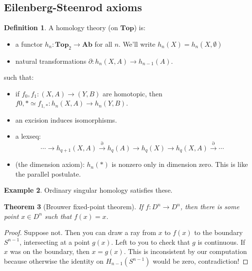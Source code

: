 \documentclass{amsart}
\theoremstyle{theorem}
\newtheorem{theorem}{Theorem}[section]
\theoremstyle{definition}
\newtheorem{definition}[theorem]{Definition}
\newtheorem{example}[theorem]{Example}
\begin{document}
\subsection{Eilenberg-Steenrod axioms}
\begin{definition}
A homology theory (on $\mathbf{Top}$) is:
\begin{itemize}
\item a functor $h_n:\mathbf{Top}_2\to\mathbf{Ab}$ for all $n$. We'll write $h_n(X)=h_n(X,\emptyset)$
\item natural transformations $\partial:h_n(X,A)\to h_{n-1}(A)$.
\end{itemize}
such that:
\begin{itemize}
\item if $f_0,f_1:(X,A)\to (Y,B)$ are homotopic, then $f{0,\ast}\simeq f_{1,\ast}:h_n(X,A)\to h_n(Y,B)$.
\item an excision induces isomorphisms.
\item a lexseq:
\begin{equation*}
\cdots\to h_{q+1}(X,A)\xrightarrow{\partial}h_q(A)\to h_q(X)\to h_q(X,A)\xrightarrow{\partial}\cdots
\end{equation*}
\item (the dimension axiom): $h_n(\ast)$ is nonzero only in dimension zero. This is like the parallel postulate.
\end{itemize}
\end{definition}
\begin{example}
Ordinary singular homology satisfies these. 
\end{example}
\begin{theorem}[Brouwer fixed-point theorem]
If $f:D^n\to D^n$, then there is some point $x\in D^n$ such that $f(x)=x$.
\end{theorem}
\begin{proof}
Suppose not. Then you can draw a ray from $x$ to $f(x)$ to the boundary $S^{n-1}$, intersecting at a point $g(x)$. Left to you to check that $g$ is continuous. If $x$ was on the boundary, then $x=g(x)$. This is inconsistent by our computation because otherwise the identity on $ H_{n-1}(S^{n-1})$ would be zero, contradiction!
\end{proof}
\end{document}
